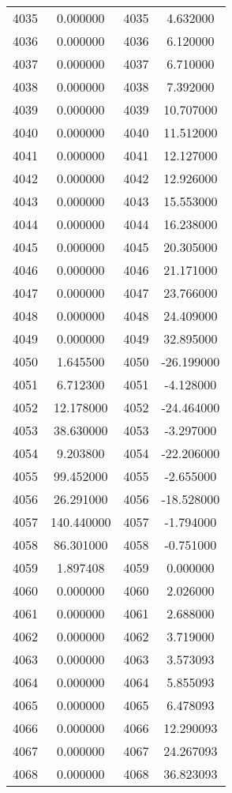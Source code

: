 \documentclass[12pt]{article}
\begin{document}
\begin{longtable}{@{}cccc@{}}
4035 & 0.000000 & 4035 & 4.632000 \\
4036 & 0.000000 & 4036 & 6.120000 \\
4037 & 0.000000 & 4037 & 6.710000 \\
4038 & 0.000000 & 4038 & 7.392000 \\
4039 & 0.000000 & 4039 & 10.707000 \\
4040 & 0.000000 & 4040 & 11.512000 \\
4041 & 0.000000 & 4041 & 12.127000 \\
4042 & 0.000000 & 4042 & 12.926000 \\
4043 & 0.000000 & 4043 & 15.553000 \\
4044 & 0.000000 & 4044 & 16.238000 \\
4045 & 0.000000 & 4045 & 20.305000 \\
4046 & 0.000000 & 4046 & 21.171000 \\
4047 & 0.000000 & 4047 & 23.766000 \\
4048 & 0.000000 & 4048 & 24.409000 \\
4049 & 0.000000 & 4049 & 32.895000 \\
4050 & 1.645500 & 4050 & -26.199000 \\
4051 & 6.712300 & 4051 & -4.128000 \\
4052 & 12.178000 & 4052 & -24.464000 \\
4053 & 38.630000 & 4053 & -3.297000 \\
4054 & 9.203800 & 4054 & -22.206000 \\
4055 & 99.452000 & 4055 & -2.655000 \\
4056 & 26.291000 & 4056 & -18.528000 \\
4057 & 140.440000 & 4057 & -1.794000 \\
4058 & 86.301000 & 4058 & -0.751000 \\
4059 & 1.897408 & 4059 & 0.000000 \\
4060 & 0.000000 & 4060 & 2.026000 \\
4061 & 0.000000 & 4061 & 2.688000 \\
4062 & 0.000000 & 4062 & 3.719000 \\
4063 & 0.000000 & 4063 & 3.573093 \\
4064 & 0.000000 & 4064 & 5.855093 \\
4065 & 0.000000 & 4065 & 6.478093 \\
4066 & 0.000000 & 4066 & 12.290093 \\
4067 & 0.000000 & 4067 & 24.267093 \\
4068 & 0.000000 & 4068 & 36.823093 \\

\end{longtable}
\end{document}
